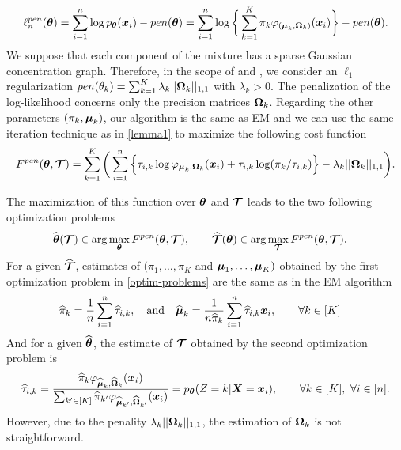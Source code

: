 \begin{equation}
\label{pen-log-likelihood}
\ell_n^{pen}({\boldsymbol\theta})=\sum_{i=1}^{n}\log p_{{\boldsymbol\theta}}(\boldsymbol x_i)-pen({\boldsymbol\theta})= \sum_{i=1}^{n}\log \bigg\{ \sum_{k=1}^K\pi_k\varphi_{(\boldsymbol\mu_{k},\boldsymbol\Omega_{k})}(\boldsymbol x_i)\bigg\} -pen({\boldsymbol\theta}).
\end{equation}
We suppose that each component of the mixture has a sparse Gaussian concentration graph. Therefore, in the scope of \citep{banerjee} and \citep{glasso07}, we consider an $\ell_1$ regularization $pen(\theta_k)=\sum_{k=1}^K\lambda_k||\boldsymbol\Omega_k||_{1,1}$ with $\lambda_k >0$. The penalization of the log-likelihood concerns only the precision matrices $\boldsymbol\Omega_k$. Regarding the other parameters $(\pi_k, \boldsymbol\mu_k)$, our algorithm is the same as EM and we can use the same iteration technique as in \cref{lemma1} to maximize the following cost function
\begin{equation}
\label{cost_fun_pen}
F^{pen}({\boldsymbol\theta},\boldsymbol{\mathcal T})  = \sum_{k=1}^K \bigg(\sum_{i=1}^{n} \Big\{\tau_{i,k}\log\varphi_{\boldsymbol\mu_{k},\boldsymbol\Omega_{k}}(\boldsymbol x_i)+\tau_{i,k}
    \log(\pi_k/\tau_{i,k})\Big\}-\lambda_k||\boldsymbol\Omega_k||_{1,1}\bigg).
\end{equation}

The maximization of this function over ${\boldsymbol\theta}$ and $\boldsymbol{\mathcal T}$ leads to the two following optimization problems
\begin{align}
\label{optim-problems}
\widehat{{\boldsymbol\theta}}(\boldsymbol{\mathcal T})&\in \arg\max_{{\boldsymbol\theta}} F^{pen}({\boldsymbol\theta},\boldsymbol{\mathcal T}),\qquad \widehat{\boldsymbol{\mathcal T}}({\boldsymbol\theta})\in \arg\max_{\boldsymbol{\mathcal T}} F^{pen}({\boldsymbol\theta},\boldsymbol{\mathcal T}).
\end{align}
For a given $\widehat{\boldsymbol{\mathcal T}}$, estimates of $(\pi_1,\dots,\pi_K$ and $\boldsymbol\mu_1,\dots,\boldsymbol\mu_K)$ obtained by the first optimization problem in \cref{optim-problems} are the same as in the EM algorithm
\begin{align}
\label{em-sols}
\widehat\pi_k     &= \frac1n\sum_{i=1}^n \widehat\tau_{i,k},\quad\text{and}\quad\widehat{\boldsymbol\mu}_k = \frac1{n\widehat\pi_k}\sum_{i=1}^n \widehat\tau_{i,k}\boldsymbol x_i ,\qquad \forall k\in[K]
\end{align}
And for a given $\widehat{{\boldsymbol\theta}}$, the estimate of $\boldsymbol{\mathcal T}$ obtained by the second optimization problem is
\begin{equation}
\label{em-sols-tau}
\widehat\tau_{i,k} = \frac{\widehat\pi_k\varphi_{\widehat{\boldsymbol\mu}_k,\widehat{\boldsymbol\Omega}_k}(\boldsymbol x_i)}{\sum_{k'\in[K]}\widehat\pi_{k'}\varphi_{\widehat{\boldsymbol\mu}_{k'},\widehat{\boldsymbol\Omega}_{k'}}(\boldsymbol x_i)}=p_{{\boldsymbol\theta}}(Z=k|\boldsymbol X=\boldsymbol x_i),\qquad\forall k\in[K],\ \forall i\in[n].
\end{equation}
However, due to the penality $\lambda_k||\boldsymbol\Omega_k||_{1,1}$, the estimation of $\boldsymbol\Omega_k$ is not straightforward.

